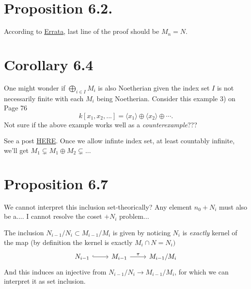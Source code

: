 
\section{Proposition 6.2.}

According to \href{https://mathoverflow.net/questions/42241/errata-for-atiyah-macdonald}{Errata}, last line of the proof should be $M_n=N$.

\section{Corollary 6.4}

One might wonder if $\bigoplus_{i\in I}M_i$ is also Noetherian given the index set $I$ is not necessarily finite with each $M_i$ being Noetherian. 
Consider this example 3) on Page 76
$$k[x_1,x_2,...]=\langle x_1\rangle \oplus\langle x_2\rangle\oplus\cdots.$$
Not sure if the above example works well as a \textit{counterexample}???

See a post \href{https://math.stackexchange.com/questions/173614/question-about-direct-sum-of-noetherian-modules-is-noetherian}{HERE}. 
Once we allow infinte index set, at least countably infinite, we'll get $M_1\subsetneq M_1\oplus M_2\subsetneq...$

\section{Proposition 6.7}

We cannot interpret this inclusion set-theorically? Any element $n_{0}+N_i$ must also be a.... I cannot resolve the coset $+N_i$ problem... 

The inclusion $N_{i-1}/N_i\subset M_{i-1}/M_i$ is given by noticing $N_i$ is \textit{exactly} kernel of the map (by definition the kernel is exactly $M_i\cap N=N_{i})$
\[\begin{tikzcd}
	{N_{i-1}} & {M_{i-1}} & {M_{i-1}/M_i}
	\arrow[hook, from=1-1, to=1-2]
	\arrow["\pi", from=1-2, to=1-3]
\end{tikzcd}\]
And this induces an injective from $N_{i-1}/N_i\to M_{i-1}/M_i$, for which we can interpret it as set inclusion.

